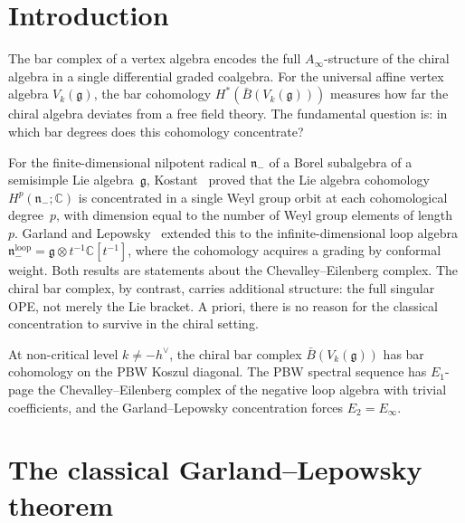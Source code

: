 \documentclass[11pt]{article}
\theoremstyle{plain}
\theoremstyle{definition}
\theoremstyle{remark}
\newcommand{\fg}{\mathfrak{g}}
\newcommand{\fn}{\mathfrak{n}}
\newcommand{\barB}{\bar{B}}
\numberwithin{equation}{section}
\begin{document}

\section{Introduction}\label{sec:intro}

The bar complex of a vertex algebra encodes the full
$A_\infty$-structure of the chiral algebra in a single
differential graded coalgebra. For the universal affine
vertex algebra $V_k(\fg)$, the bar cohomology
$H^*(\barB(V_k(\fg)))$ measures how far the chiral
algebra deviates from a free field theory. The
fundamental question is: in which bar degrees does
this cohomology concentrate?

For the finite-dimensional nilpotent radical $\fn_-$ of
a Borel subalgebra of a semisimple Lie algebra~$\fg$,
Kostant~\cite{Kostant61} proved that the Lie algebra
cohomology $H^p(\fn_-; \mathbb{C})$ is concentrated in
a single Weyl group orbit at each cohomological
degree~$p$, with dimension equal to the number of Weyl
group elements of length~$p$.
Garland and Lepowsky~\cite{GL76} extended this to the
infinite-dimensional loop algebra
$\fn_-^{\mathrm{loop}} = \fg \otimes t^{-1}\mathbb{C}[t^{-1}]$,
where the cohomology acquires a grading by conformal weight.
Both results are statements about the Chevalley--Eilenberg
complex. The chiral bar complex, by contrast, carries
additional structure: the full singular OPE, not merely
the Lie bracket. A priori, there is no reason for the
classical concentration to survive in the chiral setting.

At non-critical level \(k\neq -h^\vee\), the chiral bar complex
\(\barB(V_k(\fg))\) has bar cohomology on the PBW Koszul diagonal. The
PBW spectral sequence has \(E_1\)-page the Chevalley--Eilenberg complex
of the negative loop algebra with trivial coefficients, and the
Garland--Lepowsky concentration forces \(E_2=E_\infty\).


\section{The classical Garland--Lepowsky theorem}
\label{sec:classical-GL}
\end{document}
